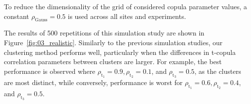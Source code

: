 \documentclass[12pt,compact]{article}
\newcommand{\JSGa}{\mathop{\mathrm{JS}^{\mathrm{G}_{\lambda}}}\nolimits}
\newcommand{\rhou}[1]{\rho_{\text{#1}}}
\begin{document}
To reduce the dimensionality of the grid of considered copula parameter values, a constant $\rhou{Gauss} = 0.5$ is used across all sites and experiments. 

The results of 500 repetitions of this simulation study are shown in Figure~\ref{fig:03_realistic}.
Similarly to the previous simulation studies, our clustering method performs well, particularly when the differences in t-copula correlation parameters between clusters are larger. 
For example, the best performance is observed where $\rho_{\text{t}_1} = 0.9, \rho_{\text{t}_2} = 0.1$, and $\rho_{\text{t}_3} = 0.5$, as the clusters are most distinct, while conversely, performance is worst for $\rho_{\text{t}_1} = 0.6, \rho_{\text{t}_2} = 0.4$, and $\rho_{\text{t}_3} = 0.5$. %
\end{document}
